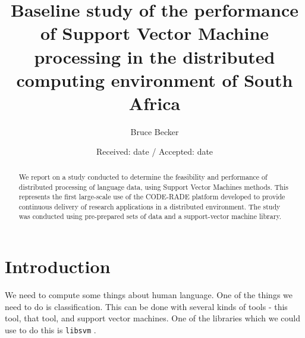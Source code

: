 \documentclass[smallextended]{svjour3}       %
\begin{document}
\title{Baseline study of the performance of Support Vector Machine processing in the distributed computing environment of South Africa%
}


\author{Bruce Becker %
}



\date{Received: date / Accepted: date}


\maketitle

\begin{abstract}
We report on a study conducted to determine the feasibility and performance of distributed processing of language data, using Support Vector Machines methods. This represents the first large-scale use of the CODE-RADE platform developed to provide continuous delivery of research applications in a distributed environment. The study was conducted using pre-prepared sets of data and a support-vector machine library. 

\end{abstract}

\section{Introduction}
\label{intro}
We need to compute some things about human language. One of the things we need to do is classification. This can be done with several kinds of tools - this tool, that tool, and support vector machines. One of the libraries which we could use to do this is \texttt{libsvm} \cite{Chang2011LIBSVMMachines}.
\end{document}
